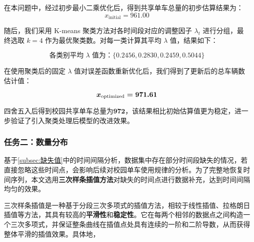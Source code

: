 \documentclass[withoutpreface,bwprint]{cumcmthesis}
\begin{document}
    在本问题中，经过初步最小二乘优化后，得到共享单车总量的初步估算结果为：
    \begin{equation}
        x_{\text{initial}} = 961.00
    \end{equation}
    
    随后，我们采用 K-means 聚类方法对各时间段对应的调整因子 \(\lambda_t\) 进行分组，最终选取 \(k=4\) 作为最优聚类数。对每一类计算其平均 \(\lambda\) 值，结果如下：
    
    \begin{equation}
        \text{各类别平均 } \lambda \text{ 值为：} \{ 0.2456, 0.2830, 0.2459, 0.5044 \}
    \end{equation}
    
    
    
    在使用聚类后的固定 \(\lambda\) 值对误差函数重新优化后，我们得到了更新后的总车辆数估计值：
    
    \begin{equation}
        \boldmath
        {x_{\text{optimized}} = 971.61}
    \end{equation}
    
    
    四舍五入后得到校园共享单车总量为{$\bm{972}$}，该结果相比初始估算值更为稳定，进一步验证了引入聚类处理后模型的改进效果。
    

\subsubsection{任务二：数量分布}
    基于\ref{subsec:缺失值}中的时间间隔分析，数据集中存在部分时间段缺失的情况，若直接忽略这些时间点，会影响后续对校园单车使用规律的分析。为了完整地恢复时间序列，本文选用\textbf{三次样条插值方法}对缺失的时间点进行数据补充，达到时间间隔均匀的效果。\par

    三次样条插值是一种基于分段三次多项式的插值方法，相较于线性插值、拉格朗日插值等方法，其具有较高的\textbf{平滑性}和\textbf{稳定性}。它在每两个相邻的数据点之间构造一个三次多项式，并保证整条曲线在插值点处具有连续的一阶和二阶导数，从而获得整体平滑的插值效果。具体地，\par
\end{document}
